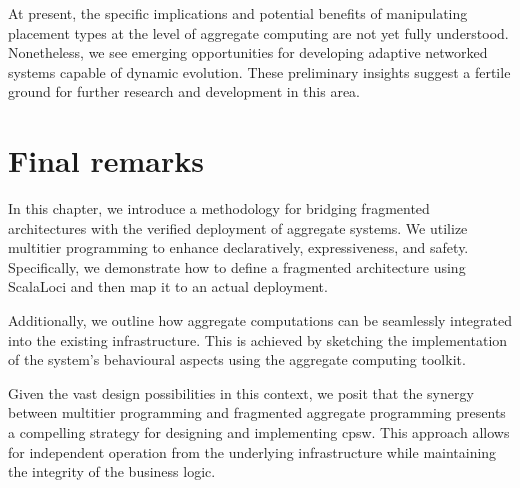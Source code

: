 At present, the specific implications and potential benefits of manipulating placement types at the level of aggregate computing are not yet fully understood. 
 Nonetheless, we see emerging opportunities for developing adaptive networked systems capable of dynamic evolution. 
 These preliminary insights suggest a fertile ground for further research and development in this area.

\section{Final remarks}
\label{conclusion}

In this chapter, 
 we introduce a methodology for bridging fragmented architectures with the verified deployment of aggregate systems. 
 We utilize multitier programming to enhance declaratively, expressiveness, and safety. 
 Specifically, we demonstrate how to define a fragmented architecture using ScalaLoci and then map it to an actual deployment.

Additionally, we outline how aggregate computations can be seamlessly integrated into the existing infrastructure. 
 This is achieved by sketching the implementation of the system's behavioural aspects using the \scafi{} aggregate computing toolkit.

Given the vast design possibilities in this context, 
 we posit that the synergy between multitier programming and fragmented aggregate programming presents a compelling strategy for designing and implementing \ac{cpsw}. 
 This approach allows for independent operation from the underlying infrastructure while maintaining the integrity of the business logic.
